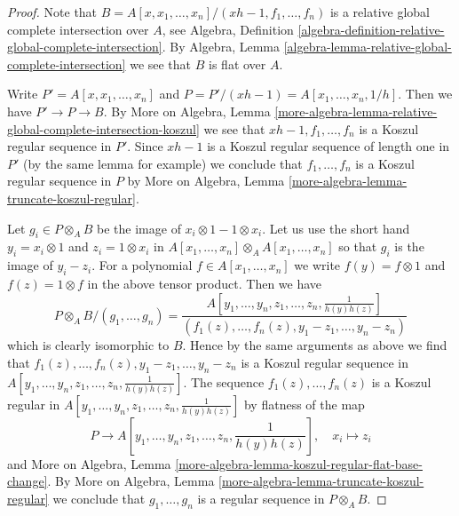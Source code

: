 \begin{proof}
Note that
$B = A[x, x_1, \ldots, x_n]/(xh - 1, f_1, \ldots, f_n)$
is a relative global complete intersection over $A$, see
Algebra, Definition
\ref{algebra-definition-relative-global-complete-intersection}.
By Algebra, Lemma \ref{algebra-lemma-relative-global-complete-intersection}
we see that $B$ is flat over $A$.

\medskip\noindent
Write $P' = A[x, x_1, \ldots, x_n]$ and
$P = P'/(xh - 1) = A[x_1, \ldots, x_n, 1/h]$.
Then we have $P' \to P \to B$.
By More on Algebra, Lemma
\ref{more-algebra-lemma-relative-global-complete-intersection-koszul}
we see that $xh - 1, f_1, \ldots, f_n$ is a Koszul regular sequence
in $P'$. Since $xh - 1$ is a Koszul regular sequence of length
one in $P'$ (by the same lemma for example) we conclude that 
$f_1, \ldots, f_n$ is a Koszul regular sequence in $P$ by
More on Algebra, Lemma \ref{more-algebra-lemma-truncate-koszul-regular}.

\medskip\noindent
Let $g_i \in P \otimes_A B$ be the image of $x_i \otimes 1 - 1 \otimes x_i$.
Let us use the short hand $y_i = x_i \otimes 1$ and $z_i = 1 \otimes x_i$
in $A[x_1, \ldots, x_n] \otimes_A A[x_1, \ldots, x_n]$
so that $g_i$ is the image of $y_i - z_i$. For a polynomial
$f \in A[x_1, \ldots, x_n]$ we write $f(y) = f \otimes 1$
and $f(z) = 1 \otimes f$ in the above tensor product.
Then we have
$$
P \otimes_A B/(g_1, \ldots, g_n) =
\frac{A[y_1, \ldots, y_n, z_1, \ldots, z_n, \frac{1}{h(y)h(z)}]}
{(f_1(z), \ldots, f_n(z), y_1 - z_1, \ldots, y_n - z_n)}
$$
which is clearly isomorphic to $B$. Hence by the same arguments
as above we find that $f_1(z), \ldots, f_n(z), y_1 - z_1, \ldots, y_n - z_n$
is a Koszul regular sequence in
$A[y_1, \ldots, y_n, z_1, \ldots, z_n, \frac{1}{h(y)h(z)}]$.
The sequence $f_1(z), \ldots, f_n(z)$ is a Koszul regular in
$A[y_1, \ldots, y_n, z_1, \ldots, z_n, \frac{1}{h(y)h(z)}]$
by flatness of the map
$$
P \longrightarrow A[y_1, \ldots, y_n, z_1, \ldots, z_n,
\textstyle{\frac{1}{h(y)h(z)}}],\quad x_i \longmapsto z_i
$$
and More on Algebra, Lemma
\ref{more-algebra-lemma-koszul-regular-flat-base-change}.
By More on Algebra, Lemma \ref{more-algebra-lemma-truncate-koszul-regular}
we conclude that $g_1, \ldots, g_n$ is a regular sequence
in $P \otimes_A B$.


\end{proof}
